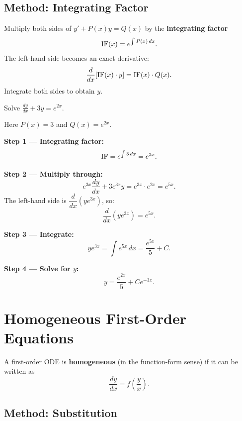 \subsection{Method: Integrating Factor}

\begin{theorem}
Multiply both sides of $y' + P(x)y = Q(x)$ by the \textbf{integrating factor}
\[
  \mathrm{IF}(x) = e^{\int P(x)\,dx}.
\]
The left-hand side becomes an exact derivative:
\[
  \frac{d}{dx}\!\left[\mathrm{IF}(x)\cdot y\right] = \mathrm{IF}(x)\cdot Q(x).
\]
Integrate both sides to obtain $y$.
\end{theorem}

\begin{example}
Solve $\displaystyle\frac{dy}{dx} + 3y = e^{2x}$.

\begin{solution}
Here $P(x)=3$ and $Q(x)=e^{2x}$.

\textbf{Step 1 — Integrating factor:}
\[
  \mathrm{IF} = e^{\int 3\,dx} = e^{3x}.
\]

\textbf{Step 2 — Multiply through:}
\[
  e^{3x}\frac{dy}{dx} + 3e^{3x}y = e^{3x}\cdot e^{2x} = e^{5x}.
\]
The left-hand side is $\dfrac{d}{dx}\!\left(ye^{3x}\right)$, so:
\[
  \frac{d}{dx}\!\left(ye^{3x}\right) = e^{5x}.
\]

\textbf{Step 3 — Integrate:}
\[
  ye^{3x} = \int e^{5x}\,dx = \frac{e^{5x}}{5} + C.
\]

\textbf{Step 4 — Solve for $y$:}
\[
  \boxed{y = \frac{e^{2x}}{5} + Ce^{-3x}.}
\]
\end{solution}
\end{example}

\section{Homogeneous First-Order Equations}

\begin{definition}
A first-order ODE is \textbf{homogeneous} (in the function-form sense) if it can be written as
\[
  \frac{dy}{dx} = f\!\left(\frac{y}{x}\right).
\]
\end{definition}

\subsection{Method: Substitution}

